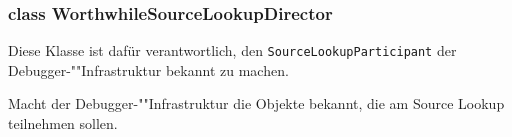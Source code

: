 \subsubsection{class WorthwhileSourceLookupDirector}

Diese Klasse ist dafür verantwortlich, den \texttt{SourceLookupParticipant} der Debugger-""Infrastruktur bekannt zu machen.

\begin{description}
	 Macht der Debugger-""Infrastruktur die Objekte bekannt, die am Source Lookup teilnehmen sollen.
\end{description}
